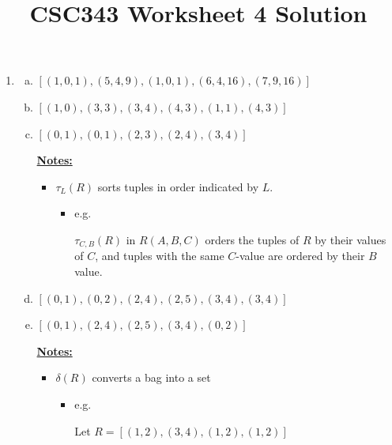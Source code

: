 \documentclass[12pt]{article}
\begin{document}
\title{CSC343 Worksheet 4 Solution}
\maketitle

\bigskip
\begin{enumerate}[1.]
    \item
    \begin{enumerate}[a)]
        \item $[(1,0,1),(5,4,9),(1,0,1),(6,4,16),(7,9,16)]$
        \item $[(1,0),(3,3),(3,4),(4,3),(1,1),(4,3)]$
        \item $[(0,1),(0,1),(2,3),(2,4),(3,4)]$

        \bigskip

        \underline{\textbf{Notes:}}

        \bigskip

        \begin{itemize}
            \item $\tau_L(R)$ sorts tuples in order indicated by $L$.
            \begin{itemize}
                \item e.g.

                \bigskip

                $\tau_{C,B}(R)$ in $R(A,B,C)$ orders the tuples of $R$ by their
                values of $C$, and tuples with the same $C$-value are ordered by their
                $B$ value.
            \end{itemize}
        \end{itemize}

        \item $[(0,1),(0,2),(2,4),(2,5),(3,4),(3,4)]$
        \item $[(0,1),(2,4),(2,5),(3,4),(0,2)]$

        \bigskip

        \underline{\textbf{Notes:}}

        \bigskip

        \begin{itemize}
            \item $\delta(R)$ converts a bag into a set
            \begin{itemize}
                \item e.g.

                \bigskip

                Let $R = [(1,2),(3,4),(1,2),(1,2)]$


\end{itemize}
\end{itemize}
\end{enumerate}
\end{enumerate}
\end{document}
